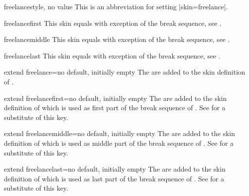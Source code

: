 \begin{docTcbKey}{freelance}{}{style, no value}
  This is an abbreviation for setting |skin=freelance|.
\end{docTcbKey}

\begin{docSkin}{freelancefirst}
  This skin equals  with exception of the break sequence,
  see .
\end{docSkin}

\begin{docSkin}{freelancemiddle}
  This skin equals  with exception of the break sequence,
  see .
\end{docSkin}

\begin{docSkin}{freelancelast}
  This skin equals  with exception of the break sequence,
  see .
\end{docSkin}


\begin{docTcbKey}{extend freelance}{=}{no default, initially empty}
The  are added to the skin definition of .
\end{docTcbKey}

\begin{docTcbKey}{extend freelancefirst}{=}{no default, initially empty}
The  are added to the skin definition of  which
is used as first part of the break sequence of .
See  for a substitute of this key.
\end{docTcbKey}

\begin{docTcbKey}{extend freelancemiddle}{=}{no default, initially empty}
The  are added to the skin definition of  which
is used as middle part of the break sequence of .
See  for a substitute of this key.
\end{docTcbKey}

\begin{docTcbKey}{extend freelancelast}{=}{no default, initially empty}
The  are added to the skin definition of  which
is used as last part of the break sequence of .
See  for a substitute of this key.
\end{docTcbKey}



